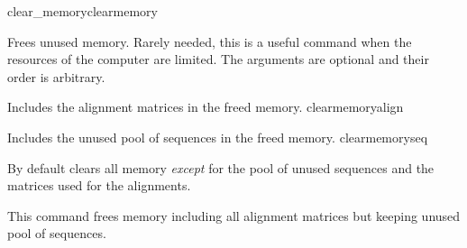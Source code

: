 


   
\begin{command}{clear\_memory}{clearmemory}

    
    \begin{poydescription}
        Frees unused memory. Rarely needed, this is a useful command when the
        resources of the computer are limited. The arguments are optional and
        their order is arbitrary.
    \end{poydescription}
    
    \begin{arguments}
            {Includes the alignment matrices in the freed memory.} 
            {clearmemoryalign}

            {Includes the unused pool of sequences in the freed memory.}
            {clearmemoryseq}
    \end{arguments}
    
    \poydefaults{}
        {By default \poy clears all memory \emph{except} for the pool of unused
        sequences and the matrices used for the alignments.}
    
    \begin{poyexamples}
            {This command frees memory including all alignment matrices but keeping
            unused pool of sequences.}
    \end{poyexamples}

    \begin{poyalso}
    \end{poyalso}
    
\end{command}



   
